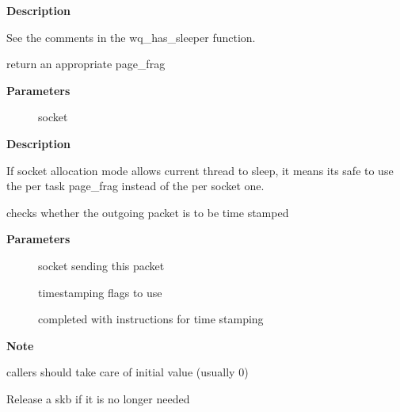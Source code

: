 \documentclass[a4paper,8pt,english]{sphinxmanual}
\begin{document}
\textbf{Description}

See the comments in the wq\_has\_sleeper function.

\begin{fulllineitems}
\label{networking/kapi:c.sk_page_frag}
return an appropriate page\_frag

\end{fulllineitems}


\textbf{Parameters}
\begin{description}
\item[{}] \leavevmode
socket

\end{description}

\textbf{Description}

If socket allocation mode allows current thread to sleep, it means its
safe to use the per task page\_frag instead of the per socket one.

\begin{fulllineitems}
\label{networking/kapi:c.sock_tx_timestamp}
checks whether the outgoing packet is to be time stamped

\end{fulllineitems}


\textbf{Parameters}
\begin{description}
\item[{}] \leavevmode
socket sending this packet

\item[{}] \leavevmode
timestamping flags to use

\item[{}] \leavevmode
completed with instructions for time stamping

\end{description}

\textbf{Note}

callers should take care of initial  value (usually 0)

\begin{fulllineitems}
\label{networking/kapi:c.sk_eat_skb}
Release a skb if it is no longer needed

\end{fulllineitems}
\end{document}
